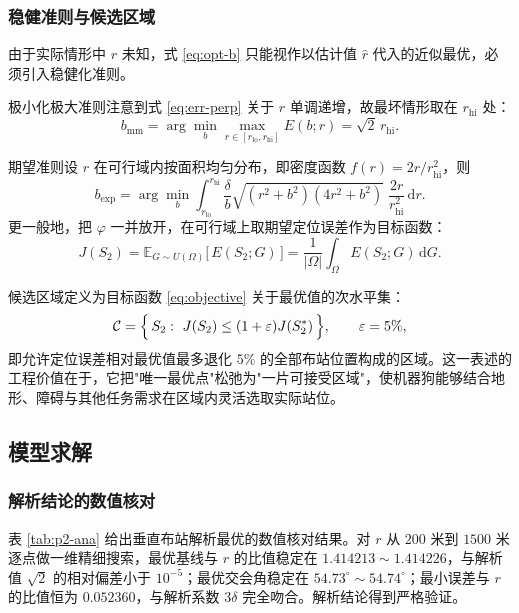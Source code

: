 \documentclass[12pt,a4paper]{ctexart}
\begin{document}
\subsubsection{稳健准则与候选区域}

由于实际情形中 $r$ 未知，式 \eqref{eq:opt-b} 只能视作以估计值 $\hat r$ 代入的近似最优，必须引入稳健化准则。

极小化极大准则注意到式 \eqref{eq:err-perp} 关于 $r$ 单调递增，故最坏情形取在 $r_{\mathrm{hi}}$ 处：
\begin{equation}
b_{\mathrm{mm}}=\arg\min_{b}\max_{r\in[r_{\mathrm{lo}},r_{\mathrm{hi}}]}E(b;r)=\sqrt2\,r_{\mathrm{hi}} .
\label{eq:minimax}
\end{equation}

期望准则设 $r$ 在可行域内按面积均匀分布，即密度函数 $f(r)=2r/r_{\mathrm{hi}}^2$，则
\begin{equation}
b_{\mathrm{exp}}=\arg\min_{b}\int_{r_{\mathrm{lo}}}^{r_{\mathrm{hi}}}\frac{\delta}{b}\sqrt{(r^2+b^2)(4r^2+b^2)}\;\frac{2r}{r_{\mathrm{hi}}^2}\,\mathrm{d}r .
\label{eq:expect}
\end{equation}
更一般地，把 $\varphi$ 一并放开，在可行域上取期望定位误差作为目标函数：
\begin{equation}
J(S_2)=\mathbb E_{G\sim U(\Omega)}\bigl[\,E(S_2;G)\,\bigr]
=\frac{1}{\lvert\Omega\rvert}\int_{\Omega}E(S_2;G)\,\mathrm{d}G .
\label{eq:objective}
\end{equation}

候选区域定义为目标函数 \eqref{eq:objective} 关于最优值的次水平集：
\begin{equation}
\mathcal C=\Bigl\{\,S_2:\ J(S_2)\le(1+\varepsilon)J(S_2^{*})\,\Bigr\},
\qquad \varepsilon=5\%,
\label{eq:candidate-region}
\end{equation}
即允许定位误差相对最优值最多退化 $5\%$ 的全部布站位置构成的区域。这一表述的工程价值在于，它把"唯一最优点"松弛为"一片可接受区域"，使机器狗能够结合地形、障碍与其他任务需求在区域内灵活选取实际站位。

\subsection{模型求解}

\subsubsection{解析结论的数值核对}

表 \ref{tab:p2-ana} 给出垂直布站解析最优的数值核对结果。对 $r$ 从 $200$ 米到 $1500$ 米逐点做一维精细搜索，最优基线与 $r$ 的比值稳定在 $1.414213\sim1.414226$，与解析值 $\sqrt2$ 的相对偏差小于 $10^{-5}$；最优交会角稳定在 $54.73^\circ\sim54.74^\circ$；最小误差与 $r$ 的比值恒为 $0.052360$，与解析系数 $3\delta$ 完全吻合。解析结论得到严格验证。
\end{document}
